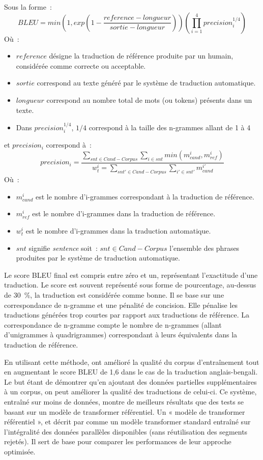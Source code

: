 Sous la forme~:
\[ BLEU=min(1,exp(1-\frac{reference-longueur}{sortie-longueur}))(\prod_{i=1}^{4}precision_{i}^{1/4}) \]
Où~:
\begin{itemize}
    \item $reference$ désigne la traduction de référence produite par un humain, considérée comme correcte ou acceptable.
    \item $sortie$ correspond au texte généré par le système de traduction automatique.
    \item $longueur$ correspond au nombre total de mots (ou tokens) présents dans un texte.
    \item Dans $precision_{i}^{1/4}$, $1/4$ correspond à la taille des n-grammes allant de 1 à 4
\end{itemize}
et $precision_{i}$ correspond à~:
\[ precision_{i}=\frac{\sum_{snt \in Cand-Corpus}\sum_{i \in snt}min(m^{i}_{cand},m^{i}_{ref})}{w^{i}_{t}=\sum_{snt' \in Cand-Corpus}\sum_{i' \in snt'}m^{i'}_{cand}} \]
Où~:
\begin{itemize}
    \item $m^{i}_{cand}$ est le nombre d'i-grammes correspondant à la traduction de référence.
    \item $m^{i}_{ref}$ est le nombre d'i-grammes dans la traduction de référence.
    \item $w^{i}_{t}$ est le nombre d'i-grammes dans la traduction automatique.
    \item $snt$ signifie \textit{sentence} soit~: $snt \in Cand-Corpus$ l'ensemble des phrases
    produites par le système de traduction automatique.
\end{itemize}

Le score BLEU final est compris entre zéro et un, représentant
l'exactitude d'une traduction. Le score est souvent représenté sous forme de pourcentage, au-dessus de 30~\%,
la traduction est considérée comme bonne. Il se base sur une correspondance de \gls{n-gramme} et une pénalité de concision.
Elle pénalise les traductions générées trop courtes par rapport
aux traductions de référence. La correspondance de n-gramme compte le nombre de n-grammes (allant d'unigrammes à quadrigrammes)
correspondant à leurs équivalents dans la traduction de référence.

En utilisant cette méthode, \citet{steingrimsson_2023} ont amélioré la qualité du corpus d'entraînement tout
en augmentant le score BLEU de 1,6 dans le cas de la traduction anglais-bengali. Le but étant de
démontrer qu'en ajoutant des données partielles supplémentaires à un corpus, on peut améliorer la qualité des traductions de celui-ci.
Ce système, entraîné sur moins de données, montre de meilleurs
résultats que des tests se basant sur un modèle de transformer référentiel.
Un « modèle de transformer référentiel », et décrit par \citet{steingrimsson_2023} comme
un modèle transformer standard entraîné sur l'intégralité des données parallèles disponibles
(sans réutilisation des segments rejetés). Il sert de base pour comparer
les performances de leur approche optimisée.

